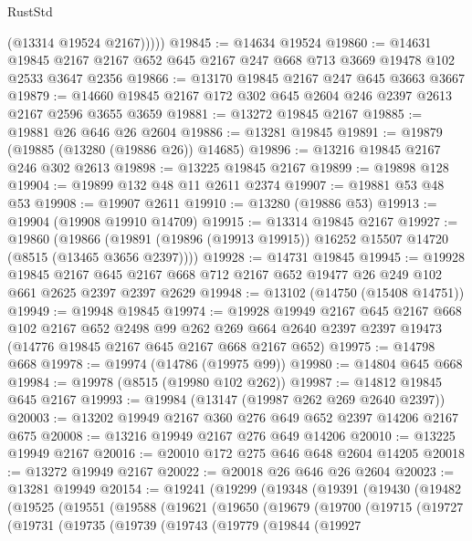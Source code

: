 \begin{lexlean}{RustStd}
\begin{coremodule}
            (@13314 @19524 @2167)))))
@19845 := @14634 @19524
@19860 := @14631
    @19845
    @2167
    @2167
    @652
    @645
    @2167
    @247
    @668
    @713
    @3669
    @19478
    @102
    @2533
    @3647
    @2356
@19866 := @13170 @19845 @2167 @247 @645 @3663 @3667
@19879 := @14660 @19845 @2167 @172 @302 @645 @2604 @246 @2397 @2613 @2167 @2596 @3655 @3659
@19881 := @13272 @19845 @2167
@19885 := @19881 @26 @646 @26 @2604
@19886 := @13281 @19845
@19891 := @19879 (@19885 (@13280 (@19886 @26)) @14685)
@19896 := @13216 @19845 @2167 @246 @302 @2613
@19898 := @13225 @19845 @2167
@19899 := @19898 @128
@19904 := @19899 @132 @48 @11 @2611 @2374
@19907 := @19881 @53 @48 @53
@19908 := @19907 @2611
@19910 := @13280 (@19886 @53)
@19913 := @19904 (@19908 @19910 @14709)
@19915 := @13314 @19845 @2167
@19927 := @19860
    (@19866 (@19891 (@19896 (@19913 @19915)) @16252 @15507 @14720 (@8515 (@13465 @3656 @2397))))
@19928 := @14731 @19845
@19945 := @19928
    @19845
    @2167
    @645
    @2167
    @668
    @712
    @2167
    @652
    @19477
    @26
    @249
    @102
    @661
    @2625
    @2397
    @2397
    @2629
@19948 := @13102 (@14750 (@15408 @14751))
@19949 := @19948 @19845
@19974 := @19928
    @19949
    @2167
    @645
    @2167
    @668
    @102
    @2167
    @652
    @2498
    @99
    @262
    @269
    @664
    @2640
    @2397
    @2397
    @19473
    (@14776 @19845 @2167 @645 @2167 @668 @2167 @652)
@19975 := @14798 @668
@19978 := @19974 (@14786 (@19975 @99))
@19980 := @14804 @645 @668
@19984 := @19978 (@8515 (@19980 @102 @262))
@19987 := @14812 @19845 @645 @2167
@19993 := @19984 (@13147 (@19987 @262 @269 @2640 @2397))
@20003 := @13202 @19949 @2167 @360 @276 @649 @652 @2397 @14206 @2167 @675
@20008 := @13216 @19949 @2167 @276 @649 @14206
@20010 := @13225 @19949 @2167
@20016 := @20010 @172 @275 @646 @648 @2604 @14205
@20018 := @13272 @19949 @2167
@20022 := @20018 @26 @646 @26 @2604
@20023 := @13281 @19949
@20154 := @19241
    (@19299
      (@19348
        (@19391
          (@19430
            (@19482
              (@19525
                (@19551
                  (@19588
                    (@19621
                      (@19650
                        (@19679
                          (@19700
                            (@19715
                              (@19727
                                (@19731
                                  (@19735
                                    (@19739
                                      (@19743
                                        (@19779
                                          (@19844
                                            (@19927

\end{coremodule}
\end{lexlean}
